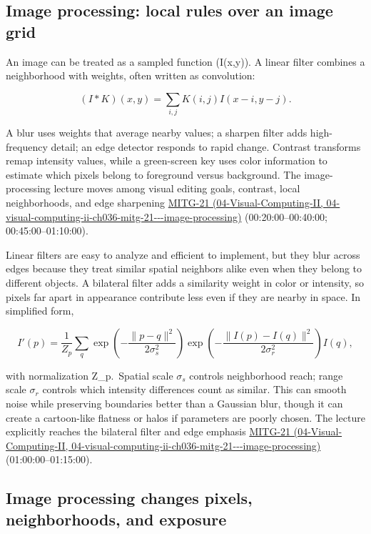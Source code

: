 \subsection{Image processing: local rules over an image grid}\label{03-visual-computing-i-ch004-image-processing-local-rules-over-an-image-grid}

An image can be treated as a sampled function (I(x,y)). A linear filter combines a neighborhood with weights, often written as convolution:

\[
(I*K)(x,y)=\sum_{i,j}K(i,j)I(x-i,y-j).
\]

A blur uses weights that average nearby values; a sharpen filter adds high-frequency detail; an edge detector responds to rapid change. Contrast transforms remap intensity values, while a green-screen key uses color information to estimate which pixels belong to foreground versus background. The image-processing lecture moves among visual editing goals, contrast, local neighborhoods, and edge sharpening \href{../04-Visual-Computing-II/main.pdf\#nameddest=04-visual-computing-ii-ch036-mitg-21---image-processing}{MITG-21 (04-Visual-Computing-II, 04-visual-computing-ii-ch036-mitg-21-\/-\/-image-processing)} (00:20:00--00:40:00; 00:45:00--01:10:00).

Linear filters are easy to analyze and efficient to implement, but they blur across edges because they treat similar spatial neighbors alike even when they belong to different objects. A bilateral filter adds a similarity weight in color or intensity, so pixels far apart in appearance contribute less even if they are nearby in space. In simplified form,

\[
I'(p)=\frac{1}{Z_p}\sum_q \exp\!\left(-\frac{\|p-q\|^2}{2\sigma_s^2}\right)\exp\!\left(-\frac{\|I(p)-I(q)\|^2}{2\sigma_r^2}\right)I(q),
\]

with normalization Z\_p.~Spatial scale \(\sigma_s\) controls neighborhood reach; range scale \(\sigma_r\) controls which intensity differences count as similar. This can smooth noise while preserving boundaries better than a Gaussian blur, though it can create a cartoon-like flatness or halos if parameters are poorly chosen. The lecture explicitly reaches the bilateral filter and edge emphasis \href{../04-Visual-Computing-II/main.pdf\#nameddest=04-visual-computing-ii-ch036-mitg-21---image-processing}{MITG-21 (04-Visual-Computing-II, 04-visual-computing-ii-ch036-mitg-21-\/-\/-image-processing)} (01:00:00--01:15:00).

\subsection{Image processing changes pixels, neighborhoods, and exposure}\label{03-visual-computing-i-ch004-image-processing-changes-pixels-neighborhoods-and-exposure}

